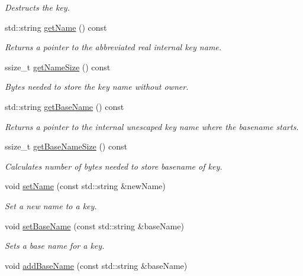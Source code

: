 \begin{DoxyCompactItemize}
\begin{DoxyCompactList}\small\item\em Destructs the key. \end{DoxyCompactList}\item 
std\+::string \hyperlink{classkdb_1_1Key_aa3903afe9a4b7aebf427a74612a803cd}{get\+Name} () const 
\begin{DoxyCompactList}\small\item\em Returns a pointer to the abbreviated real internal {\ttfamily key} name. \end{DoxyCompactList}\item 
ssize\+\_\+t \hyperlink{classkdb_1_1Key_aee1d42f22eda4d84d78ab72cd60cc005}{get\+Name\+Size} () const 
\begin{DoxyCompactList}\small\item\em Bytes needed to store the key name without owner. \end{DoxyCompactList}\item 
std\+::string \hyperlink{classkdb_1_1Key_a43d3efd13e01624c520346a19984750b}{get\+Base\+Name} () const 
\begin{DoxyCompactList}\small\item\em Returns a pointer to the internal unescaped key name where the {\ttfamily basename} starts. \end{DoxyCompactList}\item 
ssize\+\_\+t \hyperlink{classkdb_1_1Key_a92fde543f3fbfaa0f8af80dad12a9fe7}{get\+Base\+Name\+Size} () const 
\begin{DoxyCompactList}\small\item\em Calculates number of bytes needed to store basename of {\ttfamily key}. \end{DoxyCompactList}\item 
void \hyperlink{classkdb_1_1Key_aac3b5d3a854d02187484bfbdbdf975af}{set\+Name} (const std\+::string \&new\+Name)
\begin{DoxyCompactList}\small\item\em Set a new name to a key. \end{DoxyCompactList}\item 
void \hyperlink{classkdb_1_1Key_a0c8c7cef03d6482d89973be72fb3c8b8}{set\+Base\+Name} (const std\+::string \&base\+Name)
\begin{DoxyCompactList}\small\item\em Sets a base name for a key. \end{DoxyCompactList}\item 
void \hyperlink{classkdb_1_1Key_ad2f72ce0985413ce588dc33a575ea306}{add\+Base\+Name} (const std\+::string \&base\+Name)

\end{DoxyCompactItemize}
